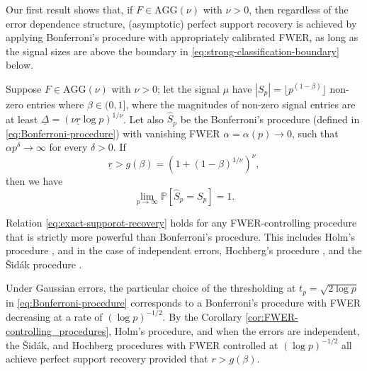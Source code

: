 
Our first result shows that, if $F\in \text{AGG}(\nu)$ with $\nu>0$, then regardless of the error dependence structure, (asymptotic) perfect support recovery is achieved by applying Bonferroni's procedure with appropriately calibrated FWER, as long as the signal sizes are above the boundary in \eqref{eq:strong-classification-boundary} below.

\begin{theorem} \label{thm:sufficient}
Suppose $F\in \text{AGG}(\nu)$ with $\nu>0$;
let the signal $\mu$ have $|S_p| = \lfloor p^{(1-\beta)} \rfloor$ non-zero entries where $\beta\in(0,1]$, where the magnitudes of non-zero signal entries are at least $\underline{\Delta} = \left(\nu\underline{r}\log p\right)^{1/\nu}$.
Let also $\widehat{S}_p$ be the Bonferroni's procedure (defined in \eqref{eq:Bonferroni-procedure}) with vanishing FWER $\alpha = \alpha(p) \to 0$, such that %
$\alpha p^\delta\to \infty$ for every $\delta>0$.
If
\begin{equation} \label{eq:signal-above-boundary}
    \underline{r} > g(\beta) = (1 + (1 - \beta)^{1/\nu})^\nu,
\end{equation}
then we have
\begin{equation} \label{eq:exact-supporot-recovery}
    \lim_{p\to\infty}\mathbb P[\widehat{S}_p = S_p] = 1.
\end{equation}
\end{theorem}
\begin{corollary}
\label{cor:FWER-controlling_procedures}  Relation \eqref{eq:exact-supporot-recovery} holds for any FWER-controlling procedure that is strictly more powerful than Bonferroni's procedure. 
This includes Holm's procedure \citep*{holm1979simple}, and in the case of independent errors, Hochberg's procedure \citep*{hochberg1988sharper}, and the {\v{S}}id{\'a}k procedure \citep*{vsidak1967rectangular}.
\end{corollary}

\begin{example} \label{exmp:FWER-controlling_procedures}
Under Gaussian errors, the particular choice of the thresholding at $t_p = \sqrt{2\log{p}}$ in \eqref{eq:Bonferroni-procedure} corresponds to a Bonferroni's procedure with FWER decreasing at a rate of $(\log{p})^{-1/2}$. By the Corollary \ref{cor:FWER-controlling_procedures}, Holm's procedure, and when the errors are independent, the {\v{S}}id{\'a}k, and Hochberg procedures with FWER controlled at $(\log{p})^{-1/2}$ all achieve perfect support recovery provided that $r>g(\beta)$.
\end{example}

